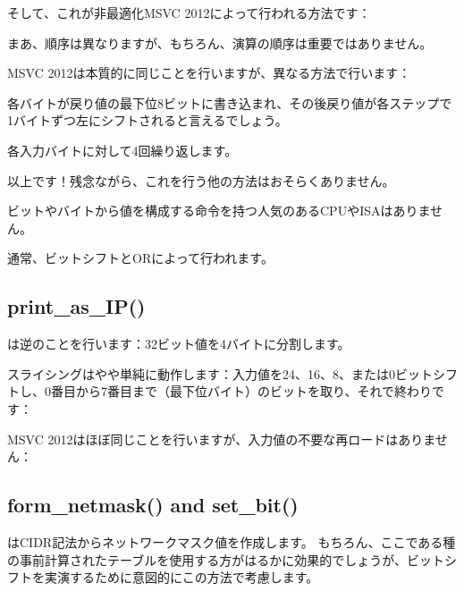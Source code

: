 そして、これが非最適化MSVC 2012によって行われる方法です：



まあ、順序は異なりますが、もちろん、演算の順序は重要ではありません。

\Optimizing MSVC 2012は本質的に同じことを行いますが、異なる方法で行います：



各バイトが戻り値の最下位8ビットに書き込まれ、その後戻り値が各ステップで1バイトずつ左にシフトされると言えるでしょう。

各入力バイトに対して4回繰り返します。

\par
以上です！残念ながら、これを行う他の方法はおそらくありません。

ビットやバイトから値を構成する命令を持つ人気のある\ac{CPU}や\ac{ISA}はありません。

通常、ビットシフトとORによって行われます。

\subsection{print\_as\_IP()}

は逆のことを行います：32ビット値を4バイトに分割します。

スライシングはやや単純に動作します：入力値を24、16、8、または0ビットシフトし、0番目から7番目まで（最下位バイト）のビットを取り、それで終わりです：



\Optimizing MSVC 2012はほぼ同じことを行いますが、入力値の不要な再ロードはありません：



\subsection{form\_netmask() and set\_bit()}

は\ac{CIDR}記法からネットワークマスク値を作成します。
もちろん、ここである種の事前計算されたテーブルを使用する方がはるかに効果的でしょうが、ビットシフトを実演するために意図的にこの方法で考慮します。

